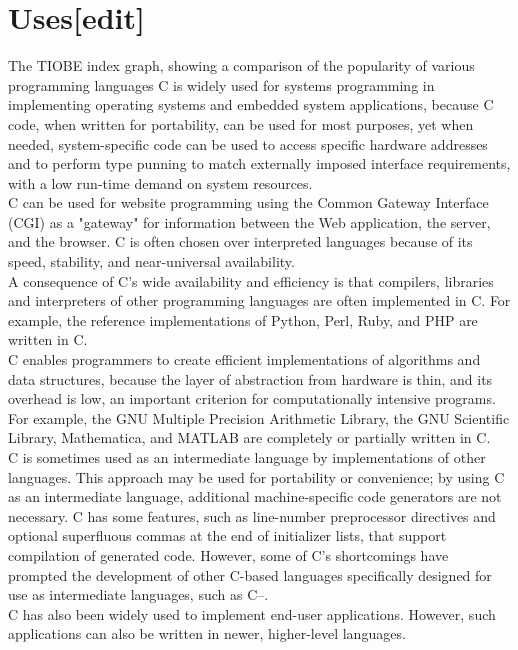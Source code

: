 \documentclass{article}\usepackage{titlesec}
\begin{document}
\section{Uses[edit]}
  The TIOBE index graph, showing a comparison of the popularity of various programming languages
C is widely used for systems programming in implementing operating systems and embedded system applications, because C code, when written for portability, can be used for most purposes, yet when needed, system-specific code can be used to access specific hardware addresses and to perform type punning to match externally imposed interface requirements, with a low run-time demand on system resources.
\\
C can be used for website programming using the Common Gateway Interface (CGI) as a "gateway" for information between the Web application, the server, and the browser. C is often chosen over interpreted languages because of its speed, stability, and near-universal availability.
\\
A consequence of C's wide availability and efficiency is that compilers, libraries and interpreters of other programming languages are often implemented in C. For example, the reference implementations of Python, Perl, Ruby, and PHP are written in C.
\\
C enables programmers to create efficient implementations of algorithms and data structures, because the layer of abstraction from hardware is thin, and its overhead is low, an important criterion for computationally intensive programs. For example, the GNU Multiple Precision Arithmetic Library, the GNU Scientific Library, Mathematica, and MATLAB are completely or partially written in C.
\\
C is sometimes used as an intermediate language by implementations of other languages. This approach may be used for portability or convenience; by using C as an intermediate language, additional machine-specific code generators are not necessary.  C has some features, such as line-number preprocessor directives and optional superfluous commas at the end of initializer lists, that support compilation of generated code. However, some of C's shortcomings have prompted the development of other C-based languages specifically designed for use as intermediate languages, such as C--.
\\
C has also been widely used to implement end-user applications. However, such applications can also be written in newer, higher-level languages.
\\
\end{document}
